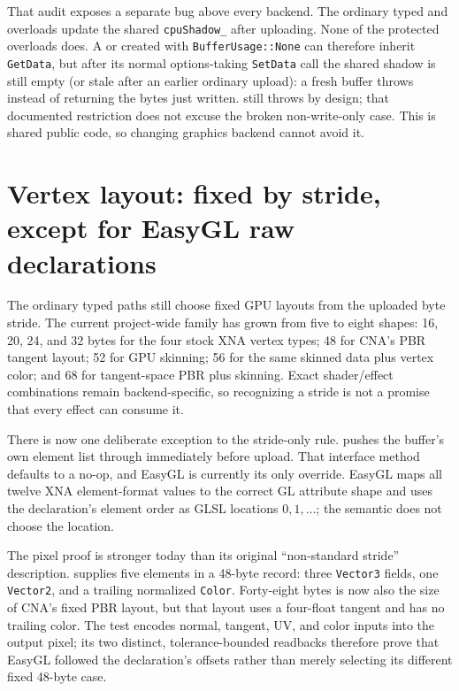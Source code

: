 That audit exposes a separate bug above every backend. The ordinary typed
 and  overloads update the shared
\texttt{cpuShadow\_} after uploading. None of the protected
 overloads does. A  or
 created with \texttt{BufferUsage::None} can therefore inherit
\texttt{GetData}, but after its normal options-taking \texttt{SetData} call the shared shadow
is still empty (or stale after an earlier ordinary upload): a fresh buffer throws
 instead of returning the bytes just written.
 still throws  by design; that
documented restriction does not excuse the broken non-write-only case. This is shared public
code, so changing graphics backend cannot avoid it.

\section{Vertex layout: fixed by stride, except for EasyGL raw declarations}
\label{sec:vertex-layout}

The ordinary typed paths still choose fixed GPU layouts from the uploaded byte stride. The
current project-wide family has grown from five to eight shapes: 16, 20, 24, and 32 bytes for
the four stock XNA vertex types; 48 for CNA's PBR tangent layout; 52 for GPU skinning; 56 for
the same skinned data plus vertex color; and 68 for tangent-space PBR plus skinning. Exact
shader/effect combinations remain backend-specific, so recognizing a stride is not a promise
that every effect can consume it.

There is now one deliberate exception to the stride-only rule.
 pushes the buffer's own
 element list through
 immediately before upload. That
interface method defaults to a no-op, and EasyGL is currently its only override. EasyGL maps
all twelve XNA element-format values to the correct GL attribute shape and uses the
declaration's element order as GLSL locations \(0,1,\ldots\); the semantic
 does not choose the location.

The pixel proof is stronger today than its original ``non-standard stride'' description.
 supplies five elements in a
48-byte record: three \texttt{Vector3} fields, one \texttt{Vector2}, and a trailing normalized
\texttt{Color}. Forty-eight bytes is now also the size of CNA's fixed PBR layout, but that
layout uses a four-float tangent and has no trailing color. The test encodes normal, tangent,
UV, and color inputs into the output pixel; its two distinct, tolerance-bounded readbacks
therefore prove that EasyGL followed the declaration's offsets rather than merely selecting
its different fixed 48-byte case.

